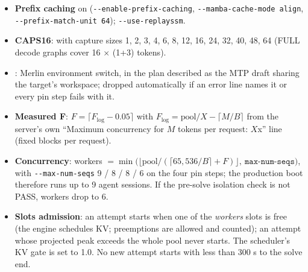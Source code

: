 \begin{itemize}[leftmargin=*,itemsep=1pt]
\item \textbf{Prefix caching} on (\texttt{-{}-enable-prefix-caching}, \texttt{-{}-mamba-cache-mode align}, \texttt{-{}-prefix-match-unit 64}); \texttt{-{}-use-replayssm}.
\item \textbf{CAPS16}:   with capture sizes 1, 2, 3, 4, 6, 8, 12, 16, 24, 32, 40, 48, 64 (FULL decode graphs cover 16 $\times$ (1+3) tokens).
\item {}: Merlin environment switch, in the plan described as the MTP draft sharing the target's workspace; dropped automatically if an error line names it or every pin step fails with it.
\item \textbf{Measured F}: $F = \lceil F_{\log} - 0.05\rceil$ with $F_{\log} = \text{pool}/X - \lceil M/B\rceil$ from the server's own ``Maximum concurrency for $M$ tokens per request: $X$x'' line (fixed blocks per request).
\item \textbf{Concurrency}: workers $=\min\big(\lfloor \text{pool}/(\lceil 65{,}536/B\rceil + F)\rfloor,\ \texttt{max-num-seqs}\big)$, with \texttt{-{}-max-num-seqs} 9 / 8 / 8 / 6 on the four pin steps; the production boot therefore runs up to 9 agent sessions. If the pre-solve isolation check is not PASS, workers drop to 6.
\item \textbf{Slots admission}: an attempt starts when one of the \emph{workers} slots is free (the engine schedules KV; preemptions are allowed and counted); an attempt whose projected peak exceeds the whole pool never starts. The scheduler's KV gate is set to 1.0. No new attempt starts with less than 300 s to the solve end.
\end{itemize}

